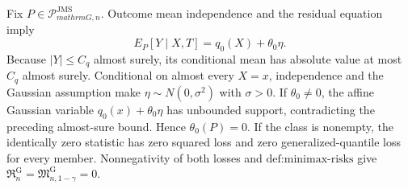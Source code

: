 Fix \(P\in\mathcal P_{mathrm G,n}^{\mathrm{JMS}}\).  Outcome mean independence and the residual equation imply
\[
 E_P[Y\mid X,T]=q_0(X)+\theta_0\eta.
\]
Because \(|Y|\le C_q\) almost surely, its conditional mean has absolute value at most \(C_q\) almost surely.  Conditional on almost every \(X=x\), independence and the Gaussian assumption make \(\eta\sim N(0,\sigma^2)\) with \(\sigma>0\).  If \(\theta_0\ne0\), the affine Gaussian variable \(q_0(x)+\theta_0\eta\) has unbounded support, contradicting the preceding almost-sure bound.  Hence \(\theta_0(P)=0\).  If the class is nonempty, the identically zero statistic has zero squared loss and zero generalized-quantile loss for every member.  Nonnegativity of both losses and \(\text{def:minimax-risks}\) give \(\mathfrak R_n^{\mathrm G}=\mathfrak M_{n,1-\gamma}^{\mathrm G}=0\).